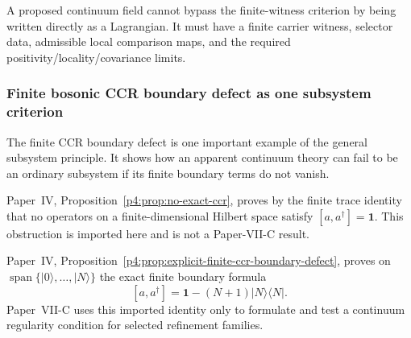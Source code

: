 \documentclass[12pt,a4paper]{article}
\begin{document}
\begin{remark}
\label{p12:rem:continuum-reconstruction-boundary}
A proposed continuum field cannot bypass the finite-witness criterion by being written directly as a Lagrangian.  It must have a finite carrier witness, selector data, admissible local comparison maps, and the required positivity/locality/covariance limits.
\end{remark}


\subsubsection{Finite bosonic CCR boundary defect as one subsystem criterion}

The finite CCR boundary defect is one important example of the general subsystem principle.  It shows how an apparent continuum theory can fail to be an ordinary subsystem if its finite boundary terms do not vanish.

\begin{remark}
\label{p12:lem:no-exact-finite-global-bosonic-ccr}
Paper~IV, Proposition~\ref{p4:prop:no-exact-ccr}, proves by the finite trace identity that no operators on a
finite-dimensional Hilbert space satisfy \([a,a^\dagger]=\mathbf1\).  This
obstruction is imported here and is not a Paper-VII-C result.
\end{remark}

\begin{remark}
\label{p12:prop:truncated-one-mode-ccr-defect}
Paper~IV, Proposition~\ref{p4:prop:explicit-finite-ccr-boundary-defect},
proves on \(\operatorname{span}\{|0\rangle,\ldots,|N\rangle\}\) the
exact finite boundary formula
\begin{equation}
\label{p12:eq:finite-ccr-boundary-defect-short}
[a,a^\dagger]=\mathbf1-(N+1)|N\rangle\langle N|.
\end{equation}
Paper~VII-C uses this imported identity only to formulate and test a continuum
regularity condition for selected refinement families.
\end{remark}
\end{document}
